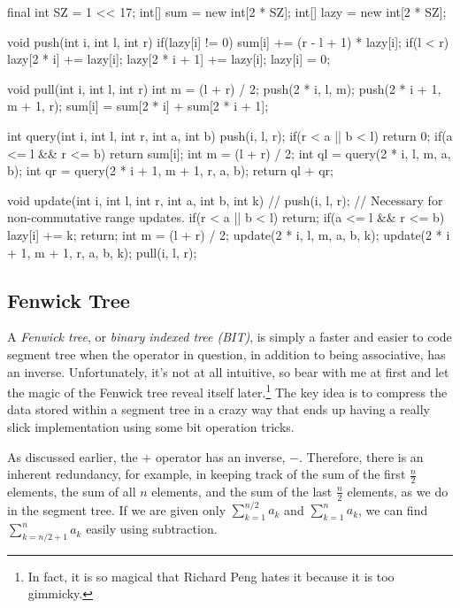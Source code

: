 \begin{mylstlisting}
final int SZ = 1 << 17;
int[] sum = new int[2 * SZ];
int[] lazy = new int[2 * SZ];

void push(int i, int l, int r){
  if(lazy[i] != 0){
    sum[i] += (r - l + 1) * lazy[i];
    if(l < r){
      lazy[2 * i] += lazy[i];
      lazy[2 * i + 1] += lazy[i];
    }
    lazy[i] = 0;
  }
}

void pull(int i, int l, int r){
  int m = (l + r) / 2;
  push(2 * i, l, m);
  push(2 * i + 1, m + 1, r);
  sum[i] = sum[2 * i] + sum[2 * i + 1];
}

int query(int i, int l, int r, int a, int b) {
  push(i, l, r);
  if(r < a || b < l) return 0;
  if(a <= l && r <= b){
    return sum[i];
  }
  int m = (l + r) / 2;
  int ql = query(2 * i, l, m, a, b);
  int qr = query(2 * i + 1, m + 1, r, a, b);
  return ql + qr;
}

void update(int i, int l, int r, int a, int b, int k) {
  // push(i, l, r); // Necessary for non-commutative range updates.
  if(r < a || b < l) return;
  if(a <= l && r <= b){
    lazy[i] += k;
    return;
  }
  int m = (l + r) / 2;
  update(2 * i, l, m, a, b, k);
  update(2 * i + 1, m + 1, r, a, b, k);
  pull(i, l, r);
}
\end{mylstlisting}

\subsection{Fenwick Tree}

A \textit{Fenwick tree}, or \textit{binary indexed tree (BIT)}, is simply a faster and easier to code segment tree when the operator in question, in addition to being associative, has an inverse. Unfortunately, it's not at all intuitive, so bear with me at first and let the magic of the Fenwick tree reveal itself later.\footnote{In fact, it is so magical that Richard Peng hates it because it is too gimmicky.} The key idea is to compress the data stored within a segment tree in a crazy way that ends up having a really slick implementation using some bit operation tricks.

As discussed earlier, the $+$ operator has an inverse, $-$. Therefore, there is an inherent redundancy, for example, in keeping track of the sum of the first $\frac{n}{2}$ elements, the sum of all $n$ elements, and the sum of the last $\frac{n}{2}$ elements, as we do in the segment tree. If we are given only $\sum_{k=1}^{n/2} a_k$ and $\sum_{k=1}^n a_k$, we can find $\sum_{k=n/2+1}^{n} a_k$ easily using subtraction.

